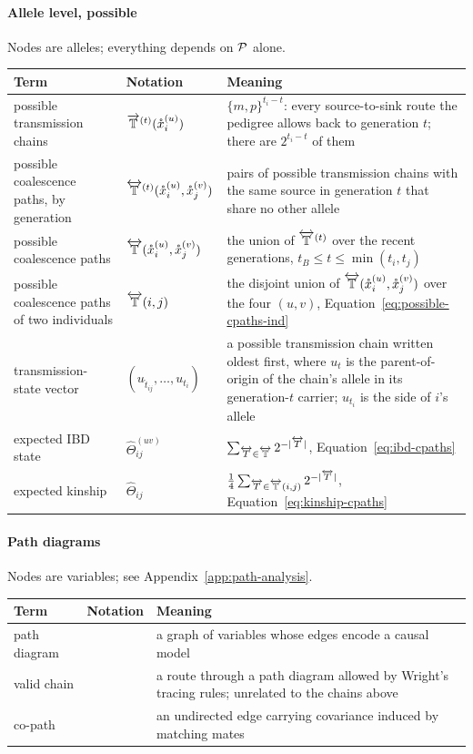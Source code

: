 \documentclass[12pt]{article}
\numberwithin{equation}{section}
\begin{document}
\paragraph{Allele level, possible} Nodes are alleles; everything depends on $\mathcal{P}$ alone.
\begingroup
\footnotesize
\renewcommand{\arraystretch}{1.15}
\begin{longtable}{>{\raggedright\arraybackslash}p{3.0cm} l >{\raggedright\arraybackslash}p{7.6cm}}
    \textbf{Term} & \textbf{Notation} & \textbf{Meaning} \\
    \hline
    \endhead
    possible transmission chains & $\overrightarrow{\mathbb{T}}^{(t)}(\mathring{x}_i^{(u)})$ & $\{m,p\}^{t_i - t}$: every source-to-sink route the pedigree allows back to generation $t$; there are $2^{t_i - t}$ of them \\
    possible coalescence paths, by generation & $\overleftrightarrow{\mathbb{T}}^{(t)}(\mathring{x}_i^{(u)}, \mathring{x}_j^{(v)})$ & pairs of possible transmission chains with the same source in generation $t$ that share no other allele \\
    possible coalescence paths & $\overleftrightarrow{\mathbb{T}}(\mathring{x}_i^{(u)}, \mathring{x}_j^{(v)})$ & the union of $\overleftrightarrow{\mathbb{T}}^{(t)}$ over the recent generations, $t_B \leq t \leq \min(t_i, t_j)$ \\
    possible coalescence paths of two individuals & $\overleftrightarrow{\mathbb{T}}(i,j)$ & the disjoint union of $\overleftrightarrow{\mathbb{T}}(\mathring{x}_i^{(u)}, \mathring{x}_j^{(v)})$ over the four $(u,v)$, Equation~\eqref{eq:possible-cpaths-ind} \\
    transmission-state vector & $(u_{\hat{t}_{ij}}, \dots, u_{t_i})$ & a possible transmission chain written oldest first, where $u_t$ is the parent-of-origin of the chain's allele in its generation-$t$ carrier; $u_{t_i}$ is the side of $i$'s allele \\
    expected IBD state & $\widehat\Theta^{(uv)}_{ij}$ & $\sum_{\overleftrightarrow{T} \in \overleftrightarrow{\mathbb{T}}} 2^{-|\overleftrightarrow{T}|}$, Equation~\eqref{eq:ibd-cpaths} \\
    expected kinship & $\widehat\Theta_{ij}$ & $\tfrac14 \sum_{\overleftrightarrow{T} \in \overleftrightarrow{\mathbb{T}}(i,j)} 2^{-|\overleftrightarrow{T}|}$, Equation~\eqref{eq:kinship-cpaths} \\
\end{longtable}
\endgroup

\paragraph{Path diagrams} Nodes are variables; see Appendix~\ref{app:path-analysis}.
\begingroup
\footnotesize
\renewcommand{\arraystretch}{1.15}
\begin{longtable}{>{\raggedright\arraybackslash}p{3.0cm} l >{\raggedright\arraybackslash}p{8.4cm}}
    \textbf{Term} & \textbf{Notation} & \textbf{Meaning} \\
    \hline
    \endhead
    path diagram & & a graph of variables whose edges encode a causal model \\
    valid chain & & a route through a path diagram allowed by Wright's tracing rules; unrelated to the chains above \\
    co-path & & an undirected edge carrying covariance induced by matching mates \\
\end{longtable}
\endgroup
\end{document}
